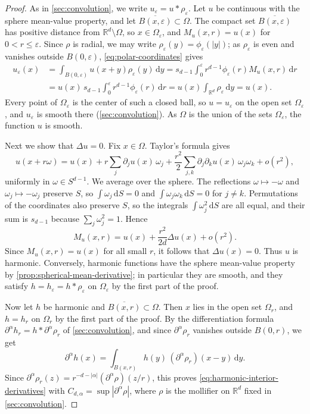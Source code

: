 \begin{proof}
As in \cref{sec:convolution}, we write $u_\varepsilon=u*\rho_\varepsilon$. Let $u$ be continuous with the sphere mean-value property, and let $\overline{B(x,\varepsilon)}\subset\Omega$. The compact set $\overline{B(x,\varepsilon)}$ has positive distance from $\mathbb R^d\setminus\Omega$, so $x\in\Omega_\varepsilon$, and $M_u(x,r)=u(x)$ for $0<r\leq\varepsilon$. Since $\rho$ is radial, we may write $\rho_\varepsilon(y)=\phi_\varepsilon(|y|)$; as $\rho_\varepsilon$ is even and vanishes outside $B(0,\varepsilon)$, \eqref{eq:polar-coordinates} gives
\begin{equation}\label{eq:mean-value-mollifier}
\begin{split}
 u_\varepsilon(x)&=\int_{B(0,\varepsilon)}u(x+y)\rho_\varepsilon(y)\,\mathrm dy=s_{d-1}\int_0^\varepsilon r^{d-1}\phi_\varepsilon(r)M_u(x,r)\,\mathrm dr\\
 &=u(x)\,s_{d-1}\int_0^\varepsilon r^{d-1}\phi_\varepsilon(r)\,\mathrm dr=u(x)\int_{\mathbb R^d}\rho_\varepsilon\,\mathrm dy=u(x).
\end{split}
\end{equation}
Every point of $\Omega_\varepsilon$ is the center of such a closed ball, so $u=u_\varepsilon$ on the open set $\Omega_\varepsilon$, and $u_\varepsilon$ is smooth there (\cref{sec:convolution}). As $\Omega$ is the union of the sets $\Omega_\varepsilon$, the function $u$ is smooth.

Next we show that $\Delta u=0$. Fix $x\in\Omega$. Taylor's formula gives
\[
 u(x+r\omega)=u(x)+r\sum_j\partial_ju(x)\,\omega_j+\frac{r^2}{2}\sum_{j,k}\partial_j\partial_ku(x)\,\omega_j\omega_k+o(r^2),
\]
uniformly in $\omega\in S^{d-1}$. We average over the sphere. The reflections $\omega\mapsto-\omega$ and $\omega_j\mapsto-\omega_j$ preserve $S$, so $\int\omega_j\,\mathrm dS=0$ and $\int\omega_j\omega_k\,\mathrm dS=0$ for $j\neq k$. Permutations of the coordinates also preserve $S$, so the integrals $\int\omega_j^2\,\mathrm dS$ are all equal, and their sum is $s_{d-1}$ because $\sum_j\omega_j^2=1$. Hence
\[
 M_u(x,r)=u(x)+\frac{r^2}{2d}\Delta u(x)+o(r^2).
\]
Since $M_u(x,r)=u(x)$ for all small $r$, it follows that $\Delta u(x)=0$. Thus $u$ is harmonic. Conversely, harmonic functions have the sphere mean-value property by \cref{prop:spherical-mean-derivative}; in particular they are smooth, and they satisfy $h=h_\varepsilon=h*\rho_\varepsilon$ on $\Omega_\varepsilon$ by the first part of the proof.

Now let $h$ be harmonic and $\overline{B(x,r)}\subset\Omega$. Then $x$ lies in the open set $\Omega_r$, and $h=h_r$ on $\Omega_r$ by the first part of the proof. By the differentiation formula $\partial^\alpha h_r=h*\partial^\alpha\rho_r$ of \cref{sec:convolution}, and since $\partial^\alpha\rho_r$ vanishes outside $B(0,r)$, we get
\[
 \partial^\alpha h(x)=\int_{B(x,r)} h(y)\,(\partial^\alpha\rho_r)(x-y)\,\mathrm d y.
\]
Since $\partial^\alpha\rho_r(z)=r^{-d-|\alpha|}(\partial^\alpha\rho)(z/r)$, this proves \eqref{eq:harmonic-interior-derivatives} with $C_{d,\alpha}=\sup|\partial^\alpha\rho|$, where $\rho$ is the mollifier on $\mathbb R^d$ fixed in \cref{sec:convolution}.
\end{proof}

